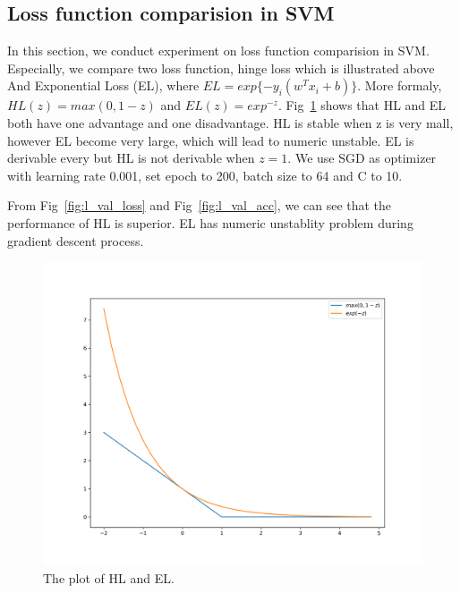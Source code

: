 \documentclass[journal, a4paper]{IEEEtran}
\begin{document}
\subsection{Loss function comparision in SVM}
In this section, we conduct experiment on loss function comparision in SVM. Especially, we compare two loss function, hinge loss which is illustrated above And Exponential Loss (EL), where $EL = exp\{-y_i(w^Tx_i + b)\}$. More formaly, $HL(z) = max(0, 1 - z)$ and $EL(z) = exp^{-z}$. Fig~\ref{fig:loss_fn} shows that HL and EL both have one advantage and one disadvantage. HL is stable when z is very mall, however EL become very large, which will lead to numeric unstable. EL is derivable every but HL is not derivable when $z = 1$. We use SGD as optimizer with learning rate 0.001, set epoch to 200, batch size to 64 and C to 10.\par
From Fig~\ref{fig:l_val_loss} and Fig~\ref{fig:l_val_acc}, we can see that the performance of HL is superior. EL has numeric unstablity problem during gradient descent process. \par
\begin{figure}[!hbt]
	\begin{center}
		\includegraphics[width=\columnwidth]{loss_fn}
		\caption{The plot of HL and EL.}
		\label{fig:loss_fn}
	\end{center}
\end{figure} \par
\end{document}

